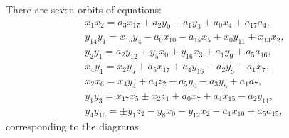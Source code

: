 \documentclass[10pt,a4paper]{amsart}
\numberwithin{equation}{section}
\theoremstyle{definition}
\begin{document}
There are seven orbits of equations:
\begin{gather}
x_1x_2 		= a_3x_{17} + a_2y_0 + a_1y_3 + a_0x_4 + a_{17}a_4, 				\tag{a}\\
y_{14}y_1 	= x_{15}y_4 - a_0x_{10} - a_{15}x_5 + x_0y_{11} + x_{13}x_2, 	\tag{b} \\
y_2y_1 		= a_2y_{12} + y_5x_0 + y_{16}x_3 + a_1y_9 + a_5a_{16} ,			\tag{c} \\
x_4y_1 		= x_2y_5 + a_5x_{17} + a_4y_{16} - a_2y_8 - a_1x_7 ,				\tag{d} \\
x_2x_6 		= x_4y_4 \mp a_4z_2 - a_5y_0 - a_3y_8 + a_1a_7 ,					\tag{e} \\
y_1y_3 		= x_{17}x_5 \pm x_2z_1 + a_0x_7 + a_4x_{15} - a_2y_{11},			\tag{f} \\
y_{4}y_{16} = \pm y_1z_2 - y_8x_0 - y_{12}x_2 - a_1x_{10} + a_5a_{15}, 			\tag{g}
\end{gather}
corresponding to the diagrams
\end{document}
